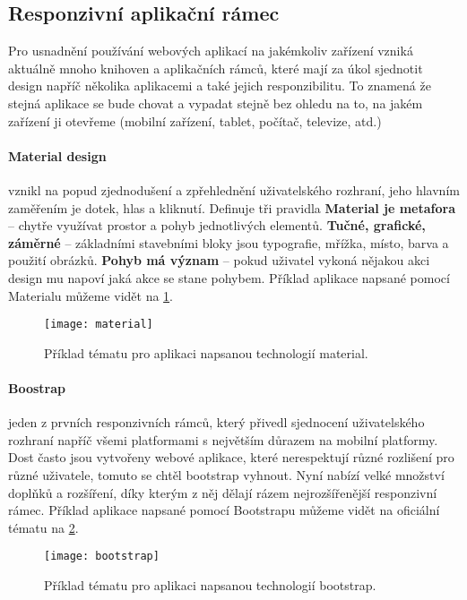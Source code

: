 \subsection{Responzivní aplikační rámec}
\par Pro usnadnění používání webových aplikací na jakémkoliv zařízení vzniká aktuálně mnoho knihoven a aplikačních rámců, které mají za úkol sjednotit design napříč několika aplikacemi a také jejich responzibilitu. To znamená že stejná aplikace se bude chovat a vypadat stejně bez ohledu na to, na jakém zařízení ji otevřeme (mobilní zařízení, tablet, počítač, televize, atd.)

\paragraph{Material design} vznikl na popud zjednodušení a zpřehlednění uživatelského rozhraní, jeho hlavním zaměřením je dotek, hlas a kliknutí. Definuje tři pravidla \textbf{Material je metafora} -- chytře využívat prostor a pohyb jednotlivých elementů. \textbf{Tučné, grafické, záměrné} -- základními stavebními bloky jsou typografie, mřížka, místo, barva a použití obrázků. \textbf{Pohyb má význam} -- pokud uživatel vykoná nějakou akci design mu napoví jaká akce se stane pohybem. \cite{material} Příklad aplikace napsané pomocí Materialu můžeme vidět na \ref{material-fig}.

\begin{figure}[htp]
\centering
\texttt{[image: material]}
\caption{Příklad tématu pro aplikaci napsanou technologií material.}
\label{material-fig}
\end{figure}

\paragraph{Boostrap} jeden z prvních responzivních rámců, který přivedl sjednocení uživatelského rozhraní napříč všemi platformami s největším důrazem na mobilní platformy. Dost často jsou vytvořeny webové aplikace, které nerespektují různé rozlišení pro různé uživatele, tomuto se chtěl bootstrap vyhnout. Nyní nabízí velké množství doplňků a rozšíření, díky kterým z něj dělají rázem nejrozšířenější responzivní rámec. \cite{bootstrap} Příklad aplikace napsané pomocí Bootstrapu můžeme vidět na oficiální tématu na \ref{bootstrap-fig}.

\begin{figure}[htp]
\centering
\texttt{[image: bootstrap]}
\caption{Příklad tématu pro aplikaci napsanou technologií bootstrap.}
\label{bootstrap-fig}
\end{figure}

